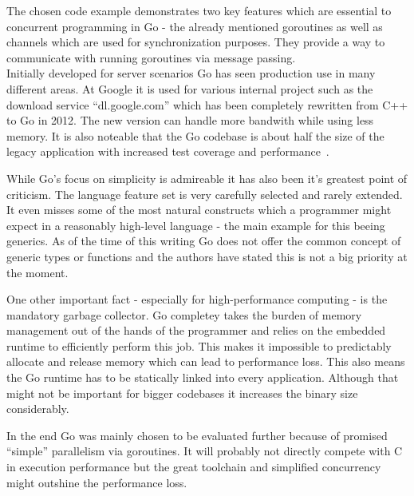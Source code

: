 The chosen code example demonstrates two key features which are essential to concurrent programming in Go - the already mentioned goroutines as well as channels which are used for synchronization purposes. They provide a way to communicate with running goroutines via message passing.
\\


Initially developed for server scenarios Go has seen production use in many different areas. At Google it is used for various internal project such as the download service ``dl.google.com'' which has been completely rewritten from C++ to Go in 2012. The new version can handle more bandwith while using less memory. It is also noteable that the Go codebase is about half the size of the legacy application with increased test coverage and performance~\cite{go_dl_google}.

While Go's focus on simplicity is admireable it has also been it's greatest point of criticism. The language feature set is very carefully selected and rarely extended. It even misses some of the most natural constructs which a programmer might expect in a reasonably high-level language - the main example for this beeing generics. As of the time of this writing Go does not offer the common concept of generic types or functions and the authors have stated this is not a big priority at the moment.

One other important fact - especially for high-performance computing - is the mandatory garbage collector. Go completey takes the burden of memory management out of the hands of the programmer and relies on the embedded runtime to efficiently perform this job. This makes it impossible to predictably allocate and release memory which can lead to performance loss. This also means the Go runtime has to be statically linked into every application. Although that might not be important for bigger codebases it increases the binary size considerably.

In the end Go was mainly chosen to be evaluated further because of promised ``simple'' parallelism via goroutines. It will probably not directly compete with C in execution performance but the great toolchain and simplified concurrency might outshine the performance loss.



